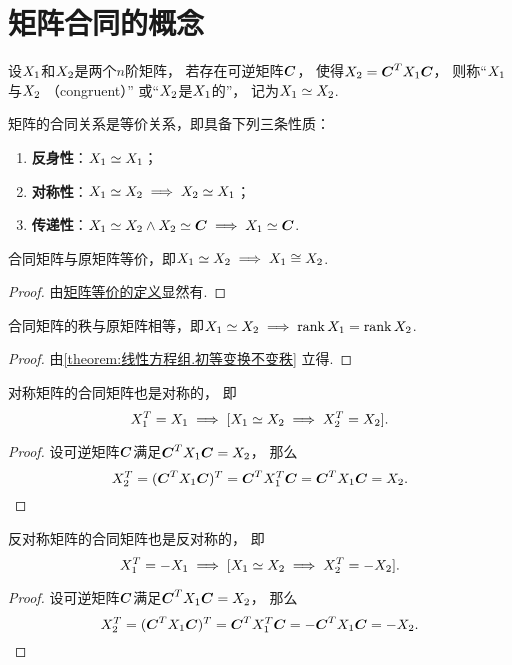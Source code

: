 \section{矩阵合同的概念}
\begin{definition}
设\(X_1\)和\(X_2\)是两个\(n\)阶矩阵，
若存在可逆矩阵\(\boldsymbol{C}\)，
使得\(X_2=\boldsymbol{C}^TX_1\boldsymbol{C}\)，
则称“\(X_1\)与\(X_2\) （congruent）”
或“\(X_2\)是\(X_1\)的”，
记为\(X_1\simeq X_2\).
\end{definition}

\begin{property}
矩阵的合同关系是等价关系，即具备下列三条性质：
\begin{enumerate}
	\item {\bf 反身性}：\(X_1\simeq X_1\)；
	\item {\bf 对称性}：\(X_1\simeq X_2 \implies X_2\simeq X_1\)；
	\item {\bf 传递性}：\(X_1\simeq X_2 \land X_2\simeq\boldsymbol{C} \implies X_1\simeq\boldsymbol{C}\).
\end{enumerate}
\end{property}

\begin{property}
合同矩阵与原矩阵等价，即\(X_1\simeq X_2 \implies X_1\cong X_2\).
\begin{proof}
由\hyperref[definition:逆矩阵.矩阵等价]{矩阵等价的定义}显然有.
\end{proof}
\end{property}

\begin{property}
合同矩阵的秩与原矩阵相等，即\(X_1\simeq X_2 \implies \rank X_1=\rank X_2\).
\begin{proof}
由\cref{theorem:线性方程组.初等变换不变秩} 立得.
\end{proof}
\end{property}

\begin{proposition}\label{theorem:矩阵的合同.对称矩阵的合同矩阵也是对称的}
对称矩阵的合同矩阵也是对称的，
即\[
	X_1^T = X_1
	\implies
	[X_1\simeq X_2 \implies X_2^T = X_2].
\]
\begin{proof}
设可逆矩阵\(\boldsymbol{C}\)满足\(\boldsymbol{C}^TX_1\boldsymbol{C}=X_2\)，
那么\[
	X_2^T = (\boldsymbol{C}^TX_1\boldsymbol{C})^T = \boldsymbol{C}^TX_1^T\boldsymbol{C} = \boldsymbol{C}^TX_1\boldsymbol{C} = X_2.
	\qedhere
\]
\end{proof}
\end{proposition}

\begin{proposition}\label{theorem:矩阵的合同.反对称矩阵的合同矩阵也是反对称的}
反对称矩阵的合同矩阵也是反对称的，
即\[
	X_1^T = -X_1
	\implies
	[X_1\simeq X_2 \implies X_2^T = -X_2].
\]
\begin{proof}
设可逆矩阵\(\boldsymbol{C}\)满足\(\boldsymbol{C}^TX_1\boldsymbol{C}=X_2\)，
那么\[
	X_2^T = (\boldsymbol{C}^TX_1\boldsymbol{C})^T = \boldsymbol{C}^TX_1^T\boldsymbol{C} = -\boldsymbol{C}^TX_1\boldsymbol{C} = -X_2.
	\qedhere
\]
\end{proof}
\end{proposition}

